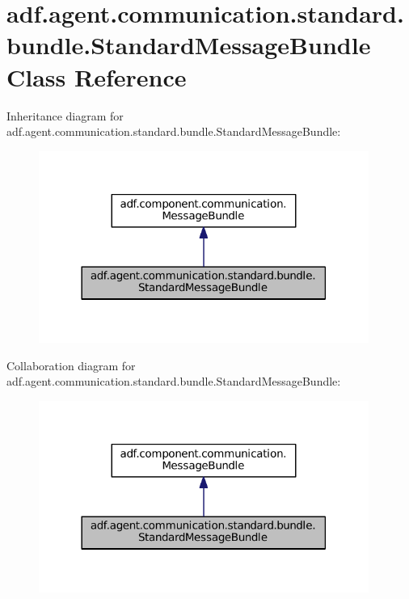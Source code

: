 \hypertarget{classadf_1_1agent_1_1communication_1_1standard_1_1bundle_1_1StandardMessageBundle}{}\section{adf.\+agent.\+communication.\+standard.\+bundle.\+Standard\+Message\+Bundle Class Reference}
\label{classadf_1_1agent_1_1communication_1_1standard_1_1bundle_1_1StandardMessageBundle}


Inheritance diagram for adf.\+agent.\+communication.\+standard.\+bundle.\+Standard\+Message\+Bundle\+:
\nopagebreak
\begin{figure}[H]
\begin{center}
\leavevmode
\includegraphics[width=306pt]{classadf_1_1agent_1_1communication_1_1standard_1_1bundle_1_1StandardMessageBundle__inherit__graph}
\end{center}
\end{figure}


Collaboration diagram for adf.\+agent.\+communication.\+standard.\+bundle.\+Standard\+Message\+Bundle\+:
\nopagebreak
\begin{figure}[H]
\begin{center}
\leavevmode
\includegraphics[width=306pt]{classadf_1_1agent_1_1communication_1_1standard_1_1bundle_1_1StandardMessageBundle__coll__graph}
\end{center}
\end{figure}
